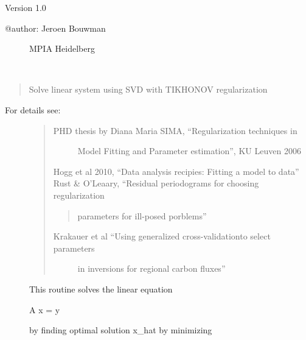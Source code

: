 \documentclass[a4paper,11pt,english]{sphinxmanual}
\begin{document}
Version 1.0
\begin{description}
\item[{@author: Jeroen Bouwman}] \leavevmode
MPIA Heidelberg

\end{description}

\begin{fulllineitems}
\label{\detokenize{cascade.cpm_model:cascade.cpm_model.cpm_model.solve_linear_equation}}~\begin{quote}

Solve linear system using SVD with TIKHONOV regularization
\end{quote}
\begin{description}
\item[{For details see:}] \leavevmode\begin{quote}
\begin{description}
\item[{PHD thesis by Diana Maria SIMA, “Regularization techniques in}] \leavevmode
Model Fitting and Parameter estimation”, KU Leuven 2006

\end{description}

Hogg et al 2010, “Data analysis recipies: Fitting a model to data”
Rust \& O’Leaary, “Residual periodograms for choosing regularization
\begin{quote}

parameters for ill-posed porblems”
\end{quote}
\begin{description}
\item[{Krakauer et al “Using generalized cross-validationto select parameters}] \leavevmode
in inversions for regional carbon fluxes”

\end{description}
\end{quote}

This routine solves the linear equation

A x = y

by finding optimal solution x\_hat by minimizing


\end{description}
\end{fulllineitems}
\end{document}
